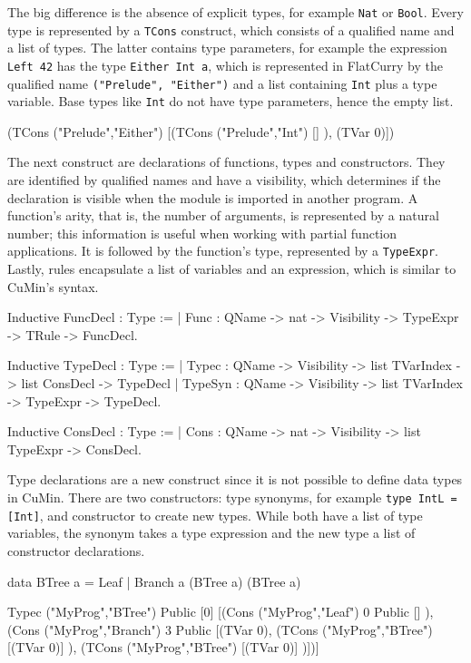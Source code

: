 \documentclass[fleqn, abstract=on]{scrreprt}
\newcommand{\coqinline}[1]{\texttt{#1}}
\begin{document}
The big difference is the absence of explicit types, for example \texttt{Nat} or \texttt{Bool}.  Every type is represented by a \coqinline{TCons} construct, which consists of a qualified name and a list of types. The latter contains type parameters, for example the expression \texttt{Left 42} has the type \texttt{Either Int a}, which is represented in FlatCurry by the qualified name \texttt{("Prelude", "Either")} and a list containing \texttt{Int} plus a type variable. Base types like \texttt{Int} do not have type parameters,  hence the empty list.
\begin{coqcode}
(TCons ("Prelude","Either") [(TCons ("Prelude","Int") [] ), (TVar 0)])
\end{coqcode}
The next construct are declarations of functions, types and constructors. They are identified by qualified names and have a visibility, which determines if the declaration is visible when the module is imported in another program. A function's arity, that is, the number of arguments, is represented by a natural number; this information is useful when working with partial function applications. It is followed by the function's type, represented by a \coqinline{TypeExpr}. Lastly, rules encapsulate a list of variables and an expression, which is similar to CuMin's syntax.
\begin{coqcode}
Inductive FuncDecl : Type := 
  | Func : QName -> nat -> Visibility -> TypeExpr -> TRule -> FuncDecl.

Inductive TypeDecl : Type :=
  | Typec   : QName -> Visibility -> list TVarIndex -> list ConsDecl -> TypeDecl
  | TypeSyn : QName -> Visibility -> list TVarIndex -> TypeExpr      -> TypeDecl.
  
Inductive ConsDecl : Type :=
  | Cons :  QName -> nat -> Visibility -> list TypeExpr -> ConsDecl.
\end{coqcode}
Type declarations are a new construct since it is not possible to define data types in CuMin. There are two constructors: type synonyms, for example \texttt{type IntL = [Int]}, and constructor to create new types. While both have a list of type variables, the synonym takes a type expression and the new type a list of constructor declarations.
\begin{coqcode}
data BTree a = Leaf | Branch a (BTree a) (BTree a)

Typec ("MyProg","BTree") Public  [0]  
[(Cons ("MyProg","Leaf") 0 Public  [] ), (Cons ("MyProg","Branch") 3 Public
                                           [(TVar 0), 
                                            (TCons ("MyProg","BTree") [(TVar 0)] ), 
                                            (TCons ("MyProg","BTree") [(TVar 0)] )])]
\end{coqcode}
\end{document}

